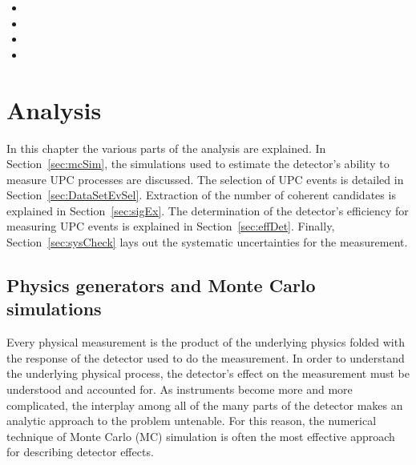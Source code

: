 
    \begin{itemize}
      \item {}\item {}\item {}\item {}\end{itemize}


\DIFaddend \chapter{\label{ch:analysis} Analysis}
  In this chapter the various parts of the analysis are explained. 
  In Section~\ref{sec:mcSim}, the simulations used to estimate the detector's 
    ability to measure UPC processes are discussed. 
  \DIFdelbegin {}\DIFdelend The selection of UPC events is detailed in Section~\ref{sec:DataSetEvSel}.
  Extraction of the number of coherent \JPsi{} candidates is explained in 
    Section~\ref{sec:sigEx}.
  The determination of the detector's efficiency for measuring UPC events is 
    explained in Section~\ref{sec:effDet}.
  Finally, Section~\ref{sec:sysCheck} lays out the systematic uncertainties 
    for the measurement. 

  \section{\label{sec:mcSim} Physics generators and Monte Carlo simulations}
    Every physical measurement is the product of the underlying physics 
      folded with the response of the detector used to do the measurement. 
    In order to understand the underlying physical process, the detector's 
      effect on the measurement must be understood and accounted for. 
    As instruments become more and more complicated, the interplay among all
      of the many parts of the detector makes an analytic approach to the 
      problem untenable.
    For this reason, the numerical technique of Monte Carlo (MC) simulation is
      often the most effective approach for describing detector effects.

